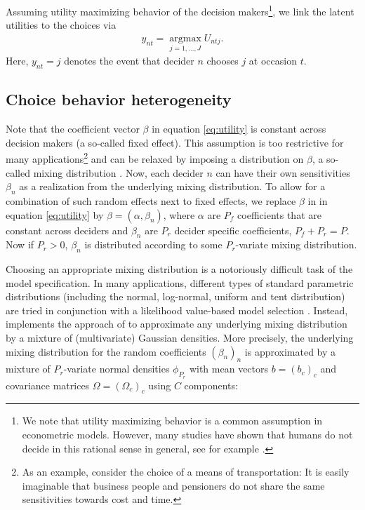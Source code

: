 \documentclass[article]{jss}
\begin{document}
Assuming utility maximizing behavior of the decision makers\footnote{We note that utility maximizing behavior is a common assumption in econometric models. However, many studies have shown that humans do not decide in this rational sense in general, see for example \cite{Hewig:2011}.}, we link the latent utilities to the choices via
\begin{align*}
   y_{nt} = \operatorname*{argmax}_{j = 1,\dots,J} U_{ntj}.
\end{align*}
Here, $y_{nt}=j$ denotes the event that decider $n$ chooses $j$ at occasion $t$.

\subsection{Choice behavior heterogeneity} \label{subsec:heterogeneity}

Note that the coefficient vector $\beta$ in equation \eqref{eq:utility} is constant across decision makers (a so-called fixed effect). This assumption is too restrictive for many applications\footnote{As an example, consider the choice of a means of transportation: It is easily imaginable that business people and pensioners do not share the same sensitivities towards cost and time.} and can be relaxed by imposing a distribution on $\beta$, a so-called mixing distribution \citep{Train:2009}. Now, each decider $n$ can have their own sensitivities $\beta_n$ as a realization from the underlying mixing distribution. To allow for a combination of such random effects next to fixed effects, we replace $\beta$ in in equation \eqref{eq:utility} by $\beta = (\alpha, \beta_n)$, where $\alpha$ are $P_f$ coefficients that are constant across deciders and $\beta_n$ are $P_r$ decider specific coefficients, $P_f + P_r = P$. Now if $P_r>0$, $\beta_n$ is distributed according to some $P_r$-variate mixing distribution.

Choosing an appropriate mixing distribution is a notoriously difficult task of the model specification. In many applications, different types of standard parametric distributions (including the normal, log-normal, uniform and tent distribution) are tried in conjunction with a likelihood value-based model selection \citep{Train:2009}. Instead,  implements the approach of \cite{Oelschlaeger:2020} to approximate any underlying mixing distribution by a mixture of (multivariate) Gaussian densities. More precisely, the underlying mixing distribution for the random coefficients $(\beta_n)_{n}$ is approximated by a mixture of $P_r$-variate normal densities $\phi_{P_r}$ with mean vectors $b=(b_c)_{c}$ and covariance matrices $\Omega=(\Omega_c)_{c}$ using $C$ components:
\end{document}
